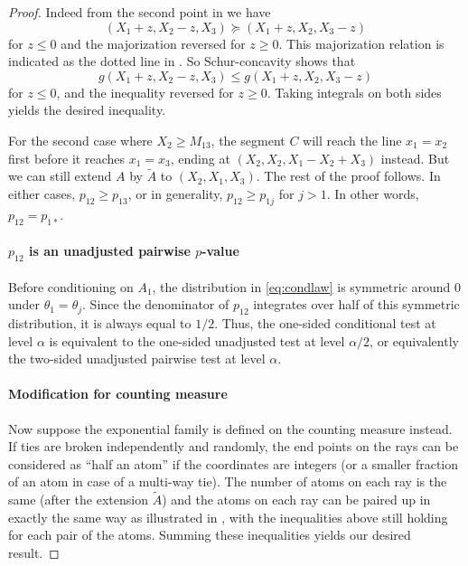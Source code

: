 \documentclass[11pt]{article}
\theoremstyle{definition}
\theoremstyle{custom}
\begin{document}
\begin{proof}
Indeed from the second point in  we have
\[\left(X_1 + z, X_2 - z, X_3\right) \succeq \left(X_1 + z, X_2, X_3 - z\right)\]
for $z \le 0$ and the majorization reversed for $z \ge 0$. This majorization relation is indicated as the dotted line in . So Schur-concavity shows that
\[g\left(X_1 + z, X_2 - z, X_3\right) \le g\left(X_1 + z, X_2, X_3 - z\right)\]
for $z \le 0$, and the inequality reversed for $z \ge 0$. Taking integrals on both sides yields the desired inequality.

For the second case where $X_2 \ge M_{13}$, the segment $C$ will reach the line $x_1 = x_2$ first before it reaches $x_1 = x_3$, ending at $\left(X_2, X_2, X_1 - X_2 + X_3\right)$ instead. But we can still extend $A$ by $\tilde{A}$ to $\left(X_2, X_1, X_3\right)$. The rest of the proof follows. In either cases, $p_{12} \ge p_{13}$, or in generality, $p_{12} \ge p_{1j}$ for $j > 1$. In other words, $p_{12} = p_{1*}$.

\paragraph{$p_{12}$ is an unadjusted pairwise $p$-value}

Before conditioning on $A_1$, the distribution in \eqref{eq:condlaw} is symmetric around $0$ under $\theta_1=\theta_j$. Since the denominator of $p_{12}$ integrates over half of this symmetric distribution, it is always equal to $1/2$. Thus, the one-sided conditional test at level $\alpha$ is equivalent to the one-sided unadjusted test at level $\alpha/2$, or equivalently the two-sided unadjusted pairwise test at level $\alpha$.

\paragraph{Modification for counting measure}

Now suppose the exponential family is defined on the counting measure instead. If ties are broken independently and randomly, the end points on the rays can be considered as ``half an atom'' if the coordinates are integers (or a smaller fraction of an atom in case of a multi-way tie). The number of atoms on each ray is the same (after the extension $\tilde{A}$) and the atoms on each ray can be paired up in exactly the same way as illustrated in , with the inequalities above still holding for each pair of the atoms. Summing these inequalities yields our desired result.
\end{proof}
\end{document}

